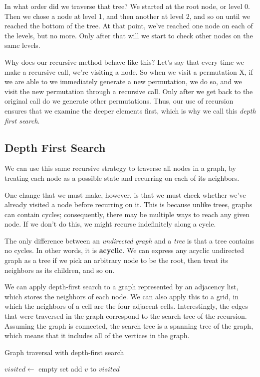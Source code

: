 In what order did we traverse that tree? We started at the root node, or level 0. Then we chose a node at level 1, and then another at level 2, and so on until we reached the bottom of the tree. At that point, we've reached one node on each of the levels, but no more. Only after that will we start to check other nodes on the same levels.

Why does our recursive method behave like this? Let's say that every time we make a recursive call, we're visiting a node. So when we visit a permutation X, if we are able to we immediately generate a new permutation, we do so, and we visit the new permutation through a recursive call. Only after we get back to the original call do we generate other permutations. Thus, our use of recursion ensures that we examine the deeper elements first, which is why we call this \textit{depth first search}.


\subsection{Depth First Search}

We can use this same recursive strategy to traverse all nodes in a graph, by treating each node as a possible state and recurring on each of its neighbors.

One change that we must make, however, is that we must check whether we've already visited a node before recurring on it. This is because unlike trees, graphs can contain cycles; consequently, there may be multiple ways to reach any given node. If we don't do this, we might recurse indefinitely along a cycle.

The only difference between an \textit{undirected graph} and a \textit{tree} is that a tree contains no cycles. In other words, it is \textbf{acyclic}. We can express any acyclic undirected graph as a tree if we pick an arbitrary node to be the root, then treat its neighbors as its children, and so on.

We can apply depth-first search to a graph represented by an adjacency list, which stores the neighbors of each node. We can also apply this to a grid, in which the neighbors of a cell are the four adjacent cells. Interestingly, the edges that were traversed in the graph correspond to the search tree of the recursion. Assuming the graph is connected, the search tree is a spanning tree of the graph, which means that it includes all of the vertices in the graph.

\begin{algorithm}[H]
\caption{Graph traversal with depth-first search}
\begin{algorithmic}

\State $visited \gets$ empty set
    \State add $v$ to $visited$
            \State {}
        \EndIf
    \EndFor
\EndFunction

\end{algorithmic}
\end{algorithm}



